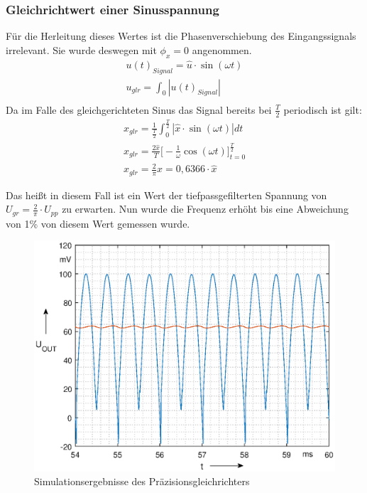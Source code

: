 \subsubsection{Gleichrichtwert einer Sinusspannung}
Für die Herleitung dieses Wertes ist die Phasenverschiebung des Eingangssignals irrelevant. Sie wurde deswegen mit $\phi_x = 0$ angenommen. 
\begin{align}
    u(t)_{Signal} =  \hat{u} \cdot \sin(\omega t) \\   
    u_{glr} = \int_{0}{|u(t)_{Signal}|} \\
\end{align}
Da im Falle des gleichgerichteten Sinus das Signal bereits bei $\frac{T}{2}$ periodisch ist gilt:
\begin{align}
x_{glr} = \frac{1}{\frac{T}{2}}\int _{0} ^{\frac{T}{2}} |\hat{x} \cdot \sin{(\omega t)}|dt\\
x_{glr} = \frac{2\hat{x}}{T} \bigl\lbrack -\frac{1}{\omega}\cos{(\omega t)} \bigr\rbrack ^{\frac{T}{2}} _{t=0} \\
x_{glr} = \frac{2}{\pi} \hat{x} = 0,6366\cdot \hat{x}
\end{align}

Das heißt in diesem Fall ist ein Wert der tiefpassgefilterten Spannung von $U_{gr} =\frac{2}{\pi}\cdot U_{pp}$ zu erwarten. Nun wurde die Frequenz erhöht bis eine Abweichung von 1\% von diesem Wert gemessen wurde.

\begin{figure}[H]
    \centering
    \includegraphics[width=\costumPicWidth]{Lab_3/Plots/Gleichrichter.eps}
    \caption{Simulationsergebnisse des Präzisionsgleichrichters}
    \label{fig:sim_Gleichrichter}
\end{figure}

